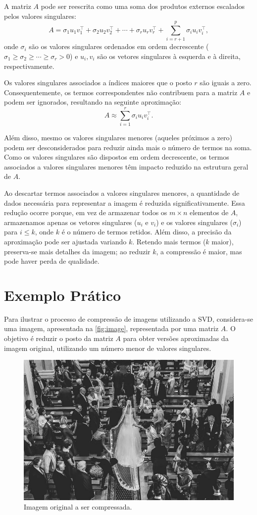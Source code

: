 A matriz \( A \) pode ser reescrita como uma soma dos produtos externos escalados pelos valores singulares:
\[
  A = \sigma_1 u_1 v_1^\top + \sigma_2 u_2 v_2^\top + \cdots + \sigma_r u_r v_r^\top + \sum_{i=r+1}^p \sigma_i u_i v_i^\top,
\]
onde \( \sigma_i \) são os valores singulares ordenados em ordem decrescente (\( \sigma_1 \geq \sigma_2 \geq \cdots \geq \sigma_r > 0 \)) e \( u_i, v_i \) são os vetores singulares à esquerda e à direita, respectivamente.

Os valores singulares associados a índices maiores que o posto \( r \) são iguais a zero. Consequentemente, os termos correspondentes não contribuem para a matriz \( A \) e podem ser ignorados, resultando na seguinte aproximação:
\[
  A \approx \sum_{i=1}^r \sigma_i u_i v_i^\top.
\]

Além disso, mesmo os valores singulares menores (aqueles próximos a zero) podem ser desconsiderados para reduzir ainda mais o número de termos na soma. Como os valores singulares são dispostos em ordem decrescente, os termos associados a valores singulares menores têm impacto reduzido na estrutura geral de \( A \).

Ao descartar termos associados a valores singulares menores, a quantidade de dados necessária para representar a imagem é reduzida significativamente. Essa redução ocorre porque, em vez de armazenar todos os \( m \times n \) elementos de \( A \), armazenamos apenas os vetores singulares (\( u_i \) e \( v_i \)) e os valores singulares (\( \sigma_i \)) para \( i \leq k \), onde \( k \) é o número de termos retidos. Além disso, a precisão da aproximação pode ser ajustada variando \( k \). Retendo mais termos (\( k \) maior), preserva-se mais detalhes da imagem; ao reduzir \( k \), a compressão é maior, mas pode haver perda de qualidade.

\section{Exemplo Prático}


Para ilustrar o processo de compressão de imagens utilizando a SVD, considera-se uma imagem, apresentada na \autoref{fig:image},  representada por uma matriz \( A \). O objetivo é reduzir o posto da matriz \( A \) para obter versões aproximadas da imagem original, utilizando um número menor de valores singulares.

\begin{figure}
  \centering
  \includegraphics[width=.45\textwidth]{Figures/image.jpeg}
  \caption{Imagem original a ser compressada.}
  \label{fig:image}
\end{figure}

